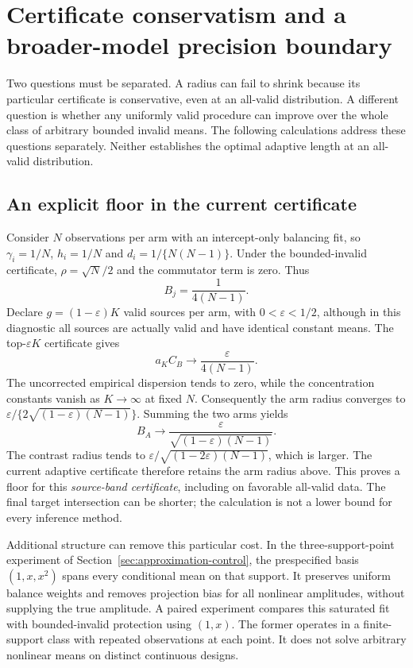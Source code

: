 \section{Certificate conservatism and a broader-model precision boundary}
\label{sec:precision-boundary}

Two questions must be separated. A radius can fail to shrink because its
particular certificate is conservative, even at an all-valid distribution.
A different question is whether any uniformly valid procedure can improve
over the whole class of arbitrary bounded invalid means. The following
calculations address these questions separately. Neither establishes the
optimal adaptive length at an all-valid distribution.

\subsection{An explicit floor in the current certificate}

Consider $N$ observations per arm with an intercept-only balancing fit, so
$\gamma_i=1/N$, $h_i=1/N$ and $d_i=1/\{N(N-1)\}$. Under the bounded-invalid
certificate, $\rho=\sqrt N/2$ and the commutator term is zero. Thus
\[
 B_j=\frac1{4(N-1)}.
\]
Declare $g=(1-\varepsilon)K$ valid sources per arm, with
$0<\varepsilon<1/2$, although in this diagnostic all sources are actually
valid and have identical constant means. The top-$\varepsilon K$ certificate
gives
\[
 a_KC_B\longrightarrow\frac{\varepsilon}{4(N-1)}.
\]
The uncorrected empirical dispersion tends to zero, while the concentration
constants vanish as $K\to\infty$ at fixed $N$. Consequently the arm radius
converges to $\varepsilon/\{2\sqrt{(1-\varepsilon)(N-1)}\}$. Summing the two
arms yields
\[
 B_A\longrightarrow\frac{\varepsilon}{\sqrt{(1-\varepsilon)(N-1)}}.
\]
The contrast radius tends to
$\varepsilon/\sqrt{(1-2\varepsilon)(N-1)}$, which is larger. The current
adaptive certificate therefore retains the arm radius above. This proves a
floor for this \emph{source-band certificate}, including on favorable
all-valid data. The final target intersection can be shorter; the calculation
is not a lower bound for every inference method.

Additional structure can remove this particular cost. In the three-support-point
experiment of Section~\ref{sec:approximation-control}, the prespecified basis
$(1,x,x^2)$ spans every conditional mean on that support. It preserves uniform
balance weights and removes projection bias for all nonlinear amplitudes,
without supplying the true amplitude. A paired experiment compares this
saturated fit with bounded-invalid protection using $(1,x)$. The former
operates in a finite-support class with repeated observations at each point.
It does not solve arbitrary nonlinear means on distinct continuous designs.

